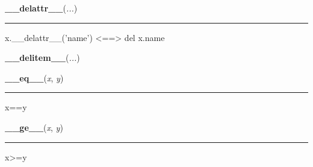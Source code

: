     \label{object:__delattr__}

    \vspace{0.5ex}

    \begin{boxedminipage}{\textwidth}

    \raggedright \textbf{\_\_delattr\_\_}(\textit{...})

    \vspace{-1.5ex}

    \rule{\textwidth}{0.5\fboxrule}

x.{\_}{\_}delattr{\_}{\_}('name') {\textless}=={\textgreater} del x.name
    \vspace{1ex}

    \end{boxedminipage}

    \label{bitarray:_bitarray:__delitem__}

    \vspace{0.5ex}

    \begin{boxedminipage}{\textwidth}

    \raggedright \textbf{\_\_delitem\_\_}(\textit{...})

    \end{boxedminipage}

    \label{bitarray:_bitarray:__eq__}

    \vspace{0.5ex}

    \begin{boxedminipage}{\textwidth}

    \raggedright \textbf{\_\_eq\_\_}(\textit{x}, \textit{y})

    \vspace{-1.5ex}

    \rule{\textwidth}{0.5\fboxrule}

x==y
    \vspace{1ex}

    \end{boxedminipage}

    \label{bitarray:_bitarray:__ge__}

    \vspace{0.5ex}

    \begin{boxedminipage}{\textwidth}

    \raggedright \textbf{\_\_ge\_\_}(\textit{x}, \textit{y})

    \vspace{-1.5ex}

    \rule{\textwidth}{0.5\fboxrule}

x{\textgreater}=y
    \vspace{1ex}

    \end{boxedminipage}

